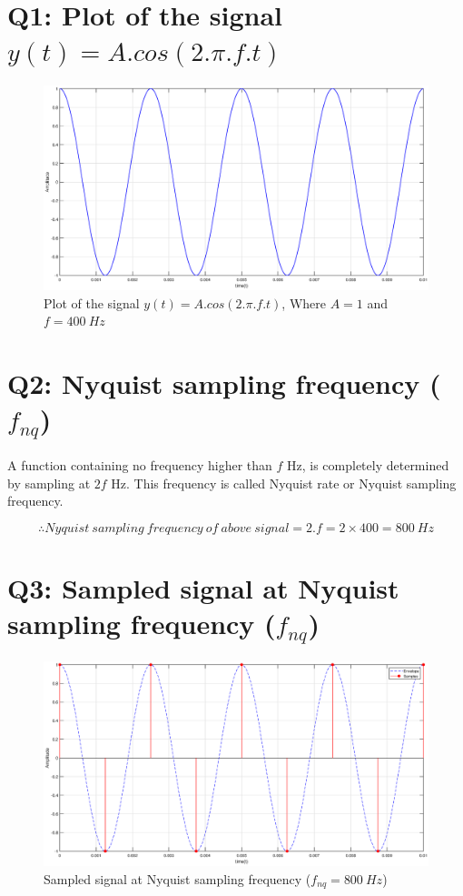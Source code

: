 \documentclass[a4paper,11pt]{article}%
\begin{document}
 
	



\section*{Q1: Plot of the signal $y(t) = A.cos(2.\pi.f.t)$}

\begin{figure}[!h]
	\centering
	\includegraphics[scale=0.45]{figures/q1}
	\caption{Plot of the signal $y(t) = A.cos(2.\pi.f.t)$, Where $A = 1$ and $f = 400 ~Hz$}
\end{figure}

\section*{Q2: Nyquist sampling frequency ($f_{nq}$)}

A function containing no frequency higher than $f$ Hz, is completely determined by sampling at $2f$ Hz. This frequency is called Nyquist rate or Nyquist sampling frequency.

\[\therefore Nyquist ~sampling ~frequency~of~above~signal = 2.f = 2\times400 = 800 ~Hz\]

\section*{Q3: Sampled signal at Nyquist sampling frequency ($f_{nq}$)}

\begin{figure}[!h]
	\centering
	\includegraphics[scale=0.45]{figures/q3}
	\caption{Sampled signal at Nyquist sampling frequency ($f_{nq} = 800 ~Hz$)}
\end{figure}
\end{document}

